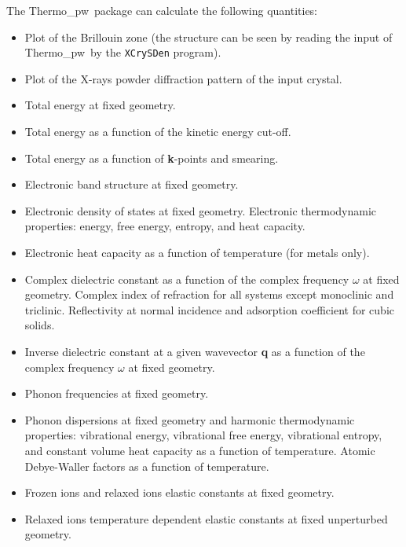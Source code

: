\documentclass[12pt,a4paper,twoside]{report}
\def\thermo{{\sc Thermo}\_{\sc pw}}
\begin{document}
The \thermo\ package can calculate the following quantities:
\begin{itemize}
\item Plot of the Brillouin zone (the structure can be seen by reading the
input of \thermo\ by the \texttt{XCrySDen} program).

\item Plot of the X-rays powder diffraction pattern of the input crystal.

\item Total energy at fixed geometry.

\item Total energy as a function of the kinetic energy cut-off.

\item Total energy as a function of {\bf k}-points and smearing.

\item Electronic band structure at fixed geometry.

\item Electronic density of states at fixed geometry. Electronic thermodynamic
properties: energy, free energy, entropy, and heat capacity. 

\item Electronic heat capacity as a function of temperature (for metals only).

\item Complex dielectric constant as a function of the complex
frequency $\omega$ at fixed geometry. Complex index of refraction for
all systems except monoclinic and triclinic. Reflectivity at normal
incidence and adsorption coefficient for cubic solids. 

\item Inverse dielectric constant at a given wavevector {\bf q} as a function 
of the complex frequency $\omega$ at fixed geometry.

\item Phonon frequencies at fixed geometry.

\item Phonon dispersions at fixed geometry and harmonic
thermodynamic properties: vibrational energy, vibrational free energy,
vibrational entropy, and constant volume heat capacity as a function of
temperature. Atomic Debye-Waller factors as a function of temperature.

\item Frozen ions and relaxed ions elastic constants at fixed geometry.

\item Relaxed ions temperature dependent elastic constants at fixed 
unperturbed geometry.


\end{itemize}
\end{document}
